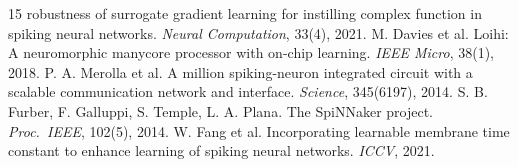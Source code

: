 \documentclass[11pt]{article}
\begin{document}
\begin{thebibliography}{15}
robustness of surrogate gradient learning for instilling complex function in
spiking neural networks. \emph{Neural Computation}, 33(4), 2021.
 M. Davies et al. Loihi: A neuromorphic
manycore processor with on-chip learning. \emph{IEEE Micro}, 38(1), 2018.
 P. A. Merolla et al. A million
spiking-neuron integrated circuit with a scalable communication network and
interface. \emph{Science}, 345(6197), 2014.
 S. B. Furber, F. Galluppi, S. Temple,
L. A. Plana. The SpiNNaker project. \emph{Proc.\ IEEE}, 102(5), 2014.
 W. Fang et al. Incorporating learnable
membrane time constant to enhance learning of spiking neural networks.
\emph{ICCV}, 2021.
\end{thebibliography}
\end{document}
